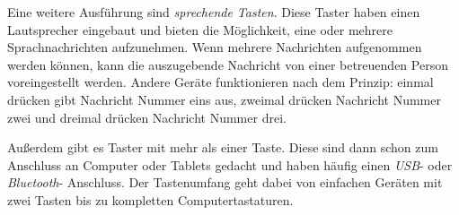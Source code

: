             Eine weitere Ausführung sind \emph{sprechende Tasten}. Diese Taster haben einen Lautsprecher eingebaut und bieten die Möglichkeit, eine oder mehrere Sprachnachrichten aufzunehmen. Wenn mehrere Nachrichten aufgenommen werden können, kann die auszugebende Nachricht von einer betreuenden Person voreingestellt werden. Andere Geräte funktionieren nach dem Prinzip: einmal drücken gibt Nachricht Nummer eins aus, zweimal drücken Nachricht Nummer zwei und dreimal drücken Nachricht Nummer drei.
            
        	Außerdem gibt es Taster mit mehr als einer Taste. Diese sind dann schon zum Anschluss an Computer oder Tablets gedacht und haben häufig einen \emph{USB}- oder \emph{Bluetooth}- Anschluss. Der Tastenumfang geht dabei von einfachen Geräten mit zwei Tasten bis zu kompletten Computertastaturen.
            

